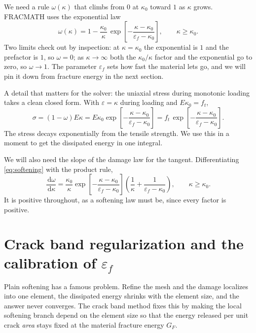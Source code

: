 \documentclass[11pt]{article}
\newcommand{\dd}{\,\mathrm{d}}
\begin{document}
We need a rule $\omega(\kappa)$ that climbs from $0$ at $\kappa_0$ toward $1$ as $\kappa$
grows. FRACMATH uses the exponential law
%
\begin{equation}
\omega(\kappa) = 1 - \frac{\kappa_0}{\kappa}\,
\exp\!\left[-\frac{\kappa-\kappa_0}{\varepsilon_f-\kappa_0}\right],
\qquad \kappa \ge \kappa_0 .
\label{eq:softening}
\end{equation}
%
Two limits check out by inspection: at $\kappa=\kappa_0$ the exponential is $1$ and the
prefactor is $1$, so $\omega=0$; as $\kappa\to\infty$ both the $\kappa_0/\kappa$ factor and
the exponential go to zero, so $\omega\to1$. The parameter $\varepsilon_f$ sets how fast the
material lets go, and we will pin it down from fracture energy in the next section.

A detail that matters for the solver: the uniaxial stress during monotonic loading takes a
clean closed form. With $\varepsilon=\kappa$ during loading and $E\kappa_0=f_t$,
%
\begin{equation}
\sigma = (1-\omega)E\kappa
       = E\kappa_0\exp\!\left[-\frac{\kappa-\kappa_0}{\varepsilon_f-\kappa_0}\right]
       = f_t\,\exp\!\left[-\frac{\kappa-\kappa_0}{\varepsilon_f-\kappa_0}\right].
\label{eq:softstress}
\end{equation}
%
The stress decays exponentially from the tensile strength. We use this in a moment to get
the dissipated energy in one integral.

We will also need the slope of the damage law for the tangent. Differentiating
\eqref{eq:softening} with the product rule,
%
\begin{equation}
\frac{\dd\omega}{\dd\kappa}
= \frac{\kappa_0}{\kappa}\exp\!\left[-\frac{\kappa-\kappa_0}{\varepsilon_f-\kappa_0}\right]
\left(\frac{1}{\kappa} + \frac{1}{\varepsilon_f-\kappa_0}\right),
\qquad \kappa \ge \kappa_0 .
\label{eq:domega}
\end{equation}
%
It is positive throughout, as a softening law must be, since every factor is positive.

\section{Crack band regularization and the calibration of $\varepsilon_f$}

Plain softening has a famous problem. Refine the mesh and the damage localizes into one
element, the dissipated energy shrinks with the element size, and the answer never
converges. The crack band method fixes this by making the local softening branch depend on
the element size so that the energy released per unit crack \emph{area} stays fixed at the
material fracture energy $G_F$.
\end{document}

